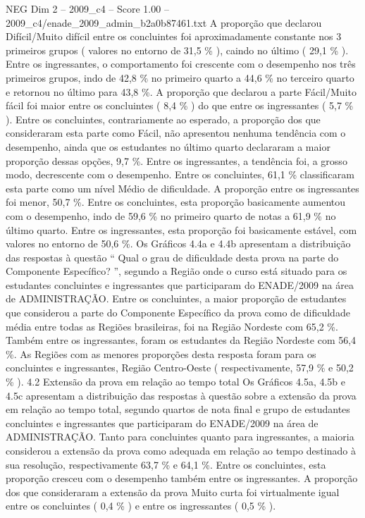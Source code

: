 \begin{textsample}{NEG Dim 2 – 2009\_c4 – Score 1.00 – 2009\_c4/enade\_2009\_admin\_b2a0b87461.txt}
A proporção que declarou Difícil/Muito difícil entre os concluintes foi aproximadamente constante nos 3 primeiros grupos ( valores no entorno de 31,5 \% ), caindo no último ( 29,1 \% ).
Entre os ingressantes, o comportamento foi crescente com o desempenho nos três primeiros grupos, indo de 42,8 \% no primeiro quarto a 44,6 \% no terceiro quarto e retornou no último para 43,8 \%.
A proporção que declarou a parte Fácil/Muito fácil foi maior entre os concluintes ( 8,4 \% ) do que entre os ingressantes ( 5,7 \% ).
Entre os concluintes, contrariamente ao esperado, a proporção dos que consideraram esta parte como Fácil, não apresentou nenhuma tendência com o desempenho, ainda que os estudantes no último quarto declararam a maior proporção dessas opções, 9,7 \%.
Entre os ingressantes, a tendência foi, a grosso modo, decrescente com o desempenho.
Entre os concluintes, 61,1 \% classificaram esta parte como um nível Médio de dificuldade.
A proporção entre os ingressantes foi menor, 50,7 \%.
Entre os concluintes, esta proporção basicamente aumentou com o desempenho, indo de 59,6 \% no primeiro quarto de notas a 61,9 \% no último quarto.
Entre os ingressantes, esta proporção foi basicamente estável, com valores no entorno de 50,6 \%.
Os Gráficos 4.4a e 4.4b apresentam a distribuição das respostas à questão “ Qual o grau de dificuldade desta prova na parte do Componente Específico? ”, segundo a Região onde o curso está situado para os estudantes concluintes e ingressantes que participaram do ENADE/2009 na área de ADMINISTRAÇÃO.
Entre os concluintes, a maior proporção de estudantes que considerou a parte do Componente Específico da prova como de dificuldade média entre todas as Regiões brasileiras, foi na Região Nordeste com 65,2 \%.
Também entre os ingressantes, foram os estudantes da Região Nordeste com 56,4 \%.
As Regiões com as menores proporções desta resposta foram para os concluintes e ingressantes, Região Centro-Oeste ( respectivamente, 57,9 \% e 50,2 \% ). 4.2 Extensão da prova em relação ao tempo total Os Gráficos 4.5a, 4.5b e 4.5c apresentam a distribuição das respostas à questão sobre a extensão da prova em relação ao tempo total, segundo quartos de nota final e grupo de estudantes concluintes e ingressantes que participaram do ENADE/2009 na área de ADMINISTRAÇÃO.
Tanto para concluintes quanto para ingressantes, a maioria considerou a extensão da prova como adequada em relação ao tempo destinado à sua resolução, respectivamente 63,7 \% e 64,1 \%.
Entre os concluintes, esta proporção cresceu com o desempenho também entre os ingressantes.
A proporção dos que consideraram a extensão da prova Muito curta foi virtualmente igual entre os concluintes ( 0,4 \% ) e entre os ingressantes ( 0,5 \% ).

\end{textsample}
